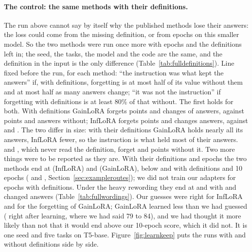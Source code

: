 \paragraph{The control: the same methods with their definitions.} The run above cannot say by itself why the published methods lose their answers: the loss could come from the missing definition, or from \AudFullEpochs{} epochs on this smaller model. So the two methods were run once more with \AudFullEpochs{} epochs and the definitions left in; the seed, the tasks, the model and the code are the same, and the definition in the input is the only difference (Table~\ref{tab:fulldefinitions}).
Line fixed before the run, for each method: ``the instruction was what kept the answers'' if, with definitions, forgetting is at most half of its value without them and at most half as many answers change; ``it was not the instruction'' if forgetting with definitions is at least 80\% of that without.
The first holds for both. With definitions GainLoRA forgets \AudFullDefOriginalGainloraFT{} points and changes \AudFullDefOriginalGainloraChanged{} of \AudFullDefCompared{} answers, against \AudFullGainloraFT{} points and \AudFullGainloraChanged{} answers without; InfLoRA forgets \AudFullDefOriginalInfloraFT{} points and changes \AudFullDefOriginalInfloraChanged{} answers, against \AudFullInfloraFT{} and \AudFullInfloraChanged{}. The two differ in size: with their definitions GainLoRA holds nearly all its answers, InfLoRA fewer, so the instruction is what held most of their answers.
\recog{} and \handicap{}, which never read the definition, forget \AudFullOursRidgeFT{} and \AudFullOursHandicapFT{} points without it.
Two more things were to be reported as they are.
With their definitions and \AudFullEpochs{} epochs the two methods end at \AudFullDefOriginalInfloraAP{} (InfLoRA) and \AudFullDefOriginalGainloraAP{} (GainLoRA), below \cert{} and \recog{} with definitions and 10 epochs (\AudUOriginalCertAP{} and \AudUOriginalRidgeAP{}, Section~\ref{sec:exampleroutes}); we did not train our adapters for \AudFullEpochs{} epochs with definitions.
Under the heavy rewording they end at \AudFullDefHeavyInfloraAP{} and \AudFullDefHeavyGainloraAP{} with \AudFullDefHeavyInfloraChanged{} and \AudFullDefHeavyGainloraChanged{} changed answers (Table~\ref{tab:fullwordings}).
Our guesses were right for InfLoRA and for the forgetting of GainLoRA; GainLoRA learned less than we had guessed (\AudFullDefOriginalGainloraLearned{} right after learning, where we had said 79 to 84), and we had thought it more likely than not that it would end above our 10-epoch score, which it did not.
It is one seed and five tasks on T5-base. Figure~\ref{fig:learnkeep} puts the runs with and without definitions side by side.

